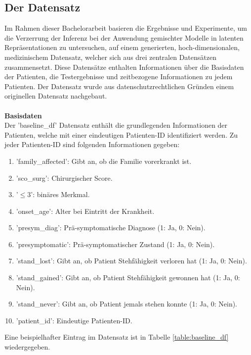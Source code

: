 \documentclass[%
thesis=student,%
coverpage=false,%
titlepage=false,%
headmarks=true, %
german,%
font=libertine, %
math=newpxtx, %
BCOR=5mm,%
coverBCOR=11mm%
]{tumbook}
\theoremstyle{break}
\begin{document}
\subsection{Der Datensatz}
Im Rahmen dieser Bachelorarbeit basieren die Ergebnisse und Experimente, um die Verzerrung der Inferenz bei der Anwendung gemischter Modelle in latenten Repräsentationen zu untersuchen, auf einem generierten, hoch-dimensionalen, medizinischem Datensatz, welcher sich aus drei zentralen Datensätzen zusammensetzt. Diese Datensätze enthalten Informationen über die Basisdaten der Patienten, die Testergebnisse und zeitbezogene Informationen zu jedem Patienten. Der Datensatz wurde aus datenschutzrechtlichen Gründen einem originellen Datensatz nachgebaut.\\
\\
\textbf{Basisdaten}\\
Der 'baseline\_df' Datensatz enthält die grundlegenden Informationen der Patienten, welche mit einer eindeutigen Patienten-ID identifiziert werden. Zu jeder Patienten-ID sind folgenden Informationen gegeben: 
\begin{enumerate}
	\item 'family\_affected': Gibt an, ob die Familie vorerkrankt ist.
	\item 'sco\_surg': Chirurgischer Score.
	\item  '$\leq3$': binäres Merkmal.
	\item 'onset\_age': Alter bei Eintritt der Krankheit.
	\item 'presym\_diag': Prä-symptomatische Diagnose (1: Ja, 0: Nein).
	\item 'presymptomatic': Prä-symptomatischer Zustand (1: Ja, 0: Nein).
	\item 'stand\_lost': Gibt an, ob Patient Stehfähigkeit verloren hat (1: Ja, 0: Nein).
	\item 'stand\_gained': Gibt an, ob Patient Stehfähigkeit gewonnen hat (1: Ja, 0: Nein).
	\item 'stand\_never': Gibt an, ob Patient jemals stehen konnte (1: Ja, 0: Nein).
	\item 'patient\_id': Eindeutige Patienten-ID.
\end{enumerate}
Eine beispielhafter Eintrag im Datensatz ist in Tabelle \ref{table:baseline_df} wiedergegeben. \\
\end{document}
